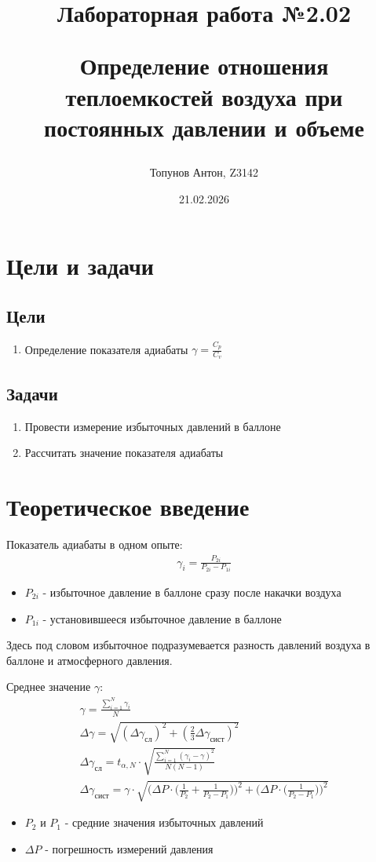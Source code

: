 \documentclass{article}
\title{Лабораторная работа №2.02

Определение отношения теплоемкостей воздуха при постоянных давлении и объеме}
\author{Топунов Антон, Z3142}
\date{21.02.2026}
\begin{document}
\maketitle
\clearpage
\section{Цели и задачи}
\subsection{Цели}
\begin{enumerate}
    \item Определение показателя адиабаты $\gamma = \frac{ C_p}{ C_v}$
\end{enumerate}
\subsection{Задачи}
\begin{enumerate}
    \item Провести измерение избыточных давлений в баллоне
    \item Рассчитать значение показателя адиабаты
\end{enumerate}
\section{Теоретическое введение}
Показатель адиабаты в одном опыте:
\begin{gather*}
    \gamma_i = \frac{ P_{2i}}{ P_{2i} - P_{1i}}
\end{gather*}
\begin{itemize}
    \item $P_{2i}$ - избыточное давление в баллоне сразу после накачки воздуха
    \item $P_{1i}$ - установившееся избыточное давление в баллоне 
\end{itemize}
Здесь под словом избыточное подразумевается разность давлений воздуха в баллоне и атмосферного давления.

Среднее значение $\gamma$:
\begin{gather*}
    \gamma = \frac{ \sum\limits_{ i=1}^{ N}\gamma_i}{ N}\\
    \Delta \gamma = \sqrt{(\Delta \gamma_\text{сл})^2 + ( \frac{ 2}{ 3}\Delta \gamma_\text{сист})^2}\\
    \Delta \gamma_\text{сл} = t_{\alpha , N} \cdot \sqrt{\frac{ \sum\limits_{i = 1 }^{N }{(\gamma_i-\gamma)^2}}{ N(N-1)}}\\
    \Delta \gamma_\text{сист} = \gamma\cdot \sqrt{\bigg(\Delta P \cdot \bigg(
        \frac{ 1}{ P_2} + \frac{ 1}{ P_2 - P_1}
        \bigg)\bigg)^2 + \bigg(\Delta P \cdot \bigg(
        \frac{ 1}{ P_2 - P_1}
        \bigg)\bigg)^2}
\end{gather*}
\begin{itemize}
    \item $P_2$ и $P_1$ - средние значения избыточных давлений
    \item $\Delta P$ - погрешность измерений давления
\end{itemize}
\end{document}
